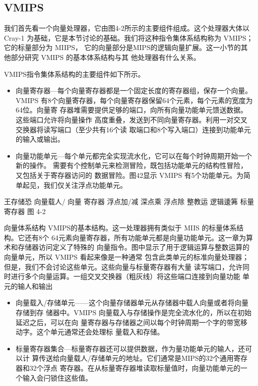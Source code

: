 \subsection{VMIPS}

我们首先看一个向量处理器，它由图4-2所示的主要组件组成。这个处理器大体以Cray-1
为基础，它是本节讨论的基础。我们将这种指令集体系结构称为 VMIPS；它的标量部分为 MIIPS，
它的向量部分是MIPS的逻辑向量扩展。这一小节的其他部分研究 VMIPS 的基本体系结构与其
他处理器有什么关系。

VMIPS指令集体系结构的主要组件如下所示。

\begin{itemize}
    \item 向量寄存器—每个向量寄存器都是一个固定长度的寄存器组，保存一个向量。VMIPS
    有8个向量寄存器，每个向量寄存器保留64个元素，每个元素的宽度为64位。向量寄
    存器堆需要提供足够的端口，向所有向量功能单元馈送数据。这些端口允许将向量操作
    高度重叠，发送到不同向量寄存器。利用一对交叉交换器将读写端口（至少共有16个读
    取端口和8个写入端口）连接到功能单元的输入或输出。
    
    \item 向量功能单元—每个单元都完全实现流水化，它可以在每个时钟周期开始一个新的操作。
    需要有个控制单元来检测冒险，既包括功能单元的结构性冒险，又包括关于寄存器访问的
    数据冒险。图42显示 VMIPS 有5个功能单元。为简单起见，我们仅关注浮点功能单元。
\end{itemize}

王存储恐
向量载人/
向量
寄存器
浮点加/减
深点乘
浮点除
整教运
逻辑逶笰
标量
寄存器
图 4-2

向量体系结构 VMIPS的基本结构。这一处理器拥有类似于 MIIS 的标量体系结构。它还有8个
64元素向量寄存器，所有功能单元都是向量功能单元。这一章为算术和存储器访问定义了特殊的
向量指令。图中显示了用于逻辑运算与整数运算的向量单元，所以 VMIPS 看起来像是一种通常
包含此类单元的标准向量处理器；但是，我们不会讨论这些单元。这些向量与标量寄存器有大量
读写端口，允许同时进行多个向量运算。一组交叉交换器（粗灰线）将这些端口连接到向量功能
单元的输人和输出

\begin{itemize}
    \item 向量载入/存储单元——这个向量存储器单元从存储器中载人向量或者将向量存储到存
    储器中。VMIPS 向量载入与存储操作是完全流水化的，所以在初始延迟之后，可以在向
    量寄存器与存储器之间以每个时钟周期一个字的带宽移动字。这个单元通常还会处理标
    量载入和存储。
    
    \item 标量寄存器集合—标量寄存器还可以提供数据，作为量功能单元的输人，还可以计
    算传送给向量载人/存储单元的地址。它们通常是MIPS的32个通用寄存器和32个浮点
    寄存器。在从标量寄存器堆读取标量值时，向量功能单元的一个输入会闩锁住这些值。
\end{itemize}

